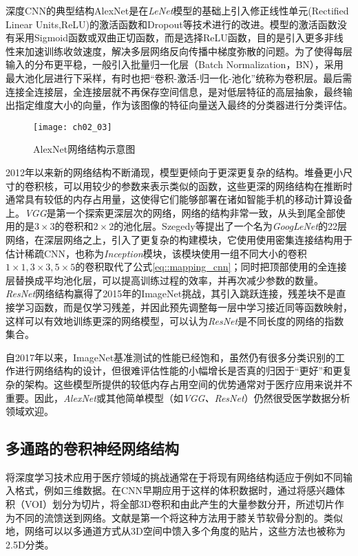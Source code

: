 深度CNN的典型结构AlexNet\cite{Krizhevsky2012}是在{\it LeNet}模型\citep{Jarrett2009}的基础上引入修正线性单元(Rectified Linear Units,ReLU)的激活函数和Dropout等技术\citep{Krizhevsky2012}进行的改进。模型的激活函数没有采用Sigmoid函数或双曲正切函数，而是选择ReLU函数，目的是引入更多非线性来加速训练收敛速度，解决多层网络反向传播中梯度弥散的问题。为了使得每层输入的分布更平稳，一般引入批量归一化层（Batch Normalization，BN）\cite{Ioffe2014Batch}，采用最大池化层进行下采样，有时也把“卷积-激活-归一化-池化”统称为卷积层。最后需连接全连接层，全连接层就不再保存空间信息，是对低层特征的高层抽象，最终输出指定维度大小的向量，作为该图像的特征向量送入最终的分类器进行分类评估。
\begin{figure}[!htbp]
    \centering
    \texttt{[image: ch02\_03]}
    \caption{AlexNet网络结构示意图\cite{Krizhevsky2012}}
    \label{fig:ch02_03}
\end{figure}
2012年以来新的网络结构不断涌现，模型更倾向于更深更复杂的结构。堆叠更小尺寸的卷积核，可以用较少的参数来表示类似的函数，这些更深的网络结构在推断时通常具有较低的内存占用量，这使得它们能够部署在诸如智能手机的移动计算设备上。{\it VGG}\citep{Simonyan2014a}是第一个探索更深层次的网络，网络的结构非常一致，从头到尾全部使用的是$3 \times 3$的卷积和$2\times 2$的池化层。Szegedy等\cite{Szegedy2015}提出了一个名为{\it GoogLeNet}的22层网络，在深层网络之上，引入了更复杂的构建模块，它使用使用密集连接结构用于估计稀疏CNN，也称为{\it Inception}模块\citep{Lin2013a}，该模块使用一组不同大小的卷积$1 \times 1,3 \times 3,5 \times 5$的卷积取代了公式\eqref{eq::mapping_cnn}；同时把顶部使用的全连接层替换成平均池化层，可以提高训练过程的效率，并再次减少参数的数量。{\it ResNet}网络结构\citep{he15}赢得了2015年的ImageNet挑战，其引入跳跃连接，残差块不是直接学习函数，而是仅学习残差，并因此预先调整每一层中学习接近同等函数映射，这样可以有效地训练更深的网络模型，可以认为{\it ResNet}是不同长度的网络的指数集合。

自2017年以来，ImageNet基准测试的性能已经饱和\cite{Deng2009ImageNet}，虽然仍有很多分类识别的工作进行网络结构的设计，但很难评估性能的小幅增长是否真的归因于“更好”和更复杂的架构。这些模型所提供的较低内存占用空间的优势通常对于医疗应用来说并不重要。因此，{\it AlexNet}或其他简单模型（如{\it VGG、ResNet}）仍然很受医学数据分析领域欢迎。

\subsection{多通路的卷积神经网络结构}
\label{sec:mc_architectures}
将深度学习技术应用于医疗领域的挑战通常在于将现有网络结构适应于例如不同输入格式，例如三维数据。在CNN早期应用于这样的体积数据时，通过将感兴趣体积（VOI）划分为切片，将全部3D卷积和由此产生的大量参数分开，所述切片作为不同的流馈送到网络。文献是第一个将这种方法用于膝关节软骨分割的。类似地，网络可以以多通道方式从3D空间中馈入多个角度的贴片\citep{Roth2014A}，这些方法也被称为2.5D分类。

